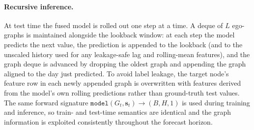 \paragraph{Recursive inference.}
At test time the fused model is rolled out one step at a time. A deque of $L$
ego-graphs is maintained alongside the lookback window: at each step the model
predicts the next value, the prediction is appended to the lookback (and to the
unscaled history used for any leakage-safe lag and rolling-mean features), and
the graph deque is advanced by dropping the oldest graph and appending the
graph aligned to the day just predicted. To avoid label leakage, the target
node's feature row in each newly appended graph is overwritten with features
derived from the model's own rolling predictions rather than ground-truth test
values. The same forward signature
$\texttt{model}(G_t, \mathbf{s}_t) \rightarrow (B, H, 1)$ is used during
training and inference, so train- and test-time semantics are identical and the
graph information is exploited consistently throughout the forecast horizon.



